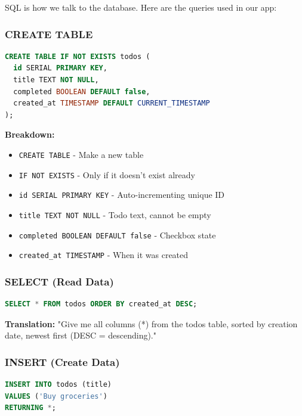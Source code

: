 \documentclass[12pt,a4paper]{article}
\begin{document}
SQL is how we talk to the database. Here are the queries used in our app:

\subsubsection{CREATE TABLE}

\begin{lstlisting}[language=SQL, caption=Creating the todos table]
CREATE TABLE IF NOT EXISTS todos (
  id SERIAL PRIMARY KEY,
  title TEXT NOT NULL,
  completed BOOLEAN DEFAULT false,
  created_at TIMESTAMP DEFAULT CURRENT_TIMESTAMP
);
\end{lstlisting}

\textbf{Breakdown:}
\begin{itemize}
    \item \texttt{CREATE TABLE} - Make a new table
    \item \texttt{IF NOT EXISTS} - Only if it doesn't exist already
    \item \texttt{id SERIAL PRIMARY KEY} - Auto-incrementing unique ID
    \item \texttt{title TEXT NOT NULL} - Todo text, cannot be empty
    \item \texttt{completed BOOLEAN DEFAULT false} - Checkbox state
    \item \texttt{created\_at TIMESTAMP} - When it was created
\end{itemize}

\subsubsection{SELECT (Read Data)}

\begin{lstlisting}[language=SQL, caption=Get all todos]
SELECT * FROM todos ORDER BY created_at DESC;
\end{lstlisting}

\textbf{Translation:} "Give me all columns (*) from the todos table, sorted by creation date, newest first (DESC = descending)."

\subsubsection{INSERT (Create Data)}

\begin{lstlisting}[language=SQL, caption=Add a new todo]
INSERT INTO todos (title) 
VALUES ('Buy groceries') 
RETURNING *;
\end{lstlisting}
\end{document}
